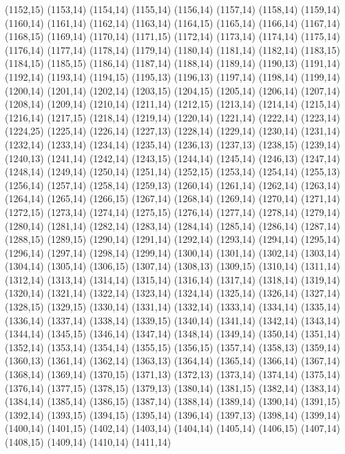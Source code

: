 (1152,15)
(1153,14)
(1154,14)
(1155,14)
(1156,14)
(1157,14)
(1158,14)
(1159,14)
(1160,14)
(1161,14)
(1162,14)
(1163,14)
(1164,15)
(1165,14)
(1166,14)
(1167,14)
(1168,15)
(1169,14)
(1170,14)
(1171,15)
(1172,14)
(1173,14)
(1174,14)
(1175,14)
(1176,14)
(1177,14)
(1178,14)
(1179,14)
(1180,14)
(1181,14)
(1182,14)
(1183,15)
(1184,15)
(1185,15)
(1186,14)
(1187,14)
(1188,14)
(1189,14)
(1190,13)
(1191,14)
(1192,14)
(1193,14)
(1194,15)
(1195,13)
(1196,13)
(1197,14)
(1198,14)
(1199,14)
(1200,14)
(1201,14)
(1202,14)
(1203,15)
(1204,15)
(1205,14)
(1206,14)
(1207,14)
(1208,14)
(1209,14)
(1210,14)
(1211,14)
(1212,15)
(1213,14)
(1214,14)
(1215,14)
(1216,14)
(1217,15)
(1218,14)
(1219,14)
(1220,14)
(1221,14)
(1222,14)
(1223,14)
(1224,25)
(1225,14)
(1226,14)
(1227,13)
(1228,14)
(1229,14)
(1230,14)
(1231,14)
(1232,14)
(1233,14)
(1234,14)
(1235,14)
(1236,13)
(1237,13)
(1238,15)
(1239,14)
(1240,13)
(1241,14)
(1242,14)
(1243,15)
(1244,14)
(1245,14)
(1246,13)
(1247,14)
(1248,14)
(1249,14)
(1250,14)
(1251,14)
(1252,15)
(1253,14)
(1254,14)
(1255,13)
(1256,14)
(1257,14)
(1258,14)
(1259,13)
(1260,14)
(1261,14)
(1262,14)
(1263,14)
(1264,14)
(1265,14)
(1266,15)
(1267,14)
(1268,14)
(1269,14)
(1270,14)
(1271,14)
(1272,15)
(1273,14)
(1274,14)
(1275,15)
(1276,14)
(1277,14)
(1278,14)
(1279,14)
(1280,14)
(1281,14)
(1282,14)
(1283,14)
(1284,14)
(1285,14)
(1286,14)
(1287,14)
(1288,15)
(1289,15)
(1290,14)
(1291,14)
(1292,14)
(1293,14)
(1294,14)
(1295,14)
(1296,14)
(1297,14)
(1298,14)
(1299,14)
(1300,14)
(1301,14)
(1302,14)
(1303,14)
(1304,14)
(1305,14)
(1306,15)
(1307,14)
(1308,13)
(1309,15)
(1310,14)
(1311,14)
(1312,14)
(1313,14)
(1314,14)
(1315,14)
(1316,14)
(1317,14)
(1318,14)
(1319,14)
(1320,14)
(1321,14)
(1322,14)
(1323,14)
(1324,14)
(1325,14)
(1326,14)
(1327,14)
(1328,15)
(1329,15)
(1330,14)
(1331,14)
(1332,14)
(1333,14)
(1334,14)
(1335,14)
(1336,14)
(1337,14)
(1338,14)
(1339,15)
(1340,14)
(1341,14)
(1342,14)
(1343,14)
(1344,14)
(1345,15)
(1346,14)
(1347,14)
(1348,14)
(1349,14)
(1350,14)
(1351,14)
(1352,14)
(1353,14)
(1354,14)
(1355,15)
(1356,15)
(1357,14)
(1358,13)
(1359,14)
(1360,13)
(1361,14)
(1362,14)
(1363,13)
(1364,14)
(1365,14)
(1366,14)
(1367,14)
(1368,14)
(1369,14)
(1370,15)
(1371,13)
(1372,13)
(1373,14)
(1374,14)
(1375,14)
(1376,14)
(1377,15)
(1378,15)
(1379,13)
(1380,14)
(1381,15)
(1382,14)
(1383,14)
(1384,14)
(1385,14)
(1386,15)
(1387,14)
(1388,14)
(1389,14)
(1390,14)
(1391,15)
(1392,14)
(1393,15)
(1394,15)
(1395,14)
(1396,14)
(1397,13)
(1398,14)
(1399,14)
(1400,14)
(1401,15)
(1402,14)
(1403,14)
(1404,14)
(1405,14)
(1406,15)
(1407,14)
(1408,15)
(1409,14)
(1410,14)
(1411,14)
